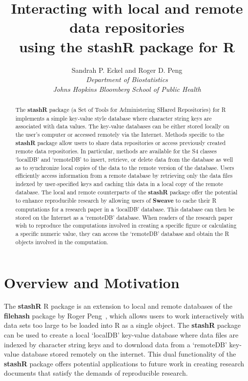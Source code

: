 \documentclass{article}
\title{Interacting with local and remote data repositories\\ 
using the \textbf{stashR} package for R}
\author{Sandrah P. Eckel and Roger D. Peng \\
\textit{Department of
Biostatistics}\\\textit{Johns Hopkins Bloomberg School of Public Health}}
\date{}
\newcommand{\pkg}{\textbf}
\begin{document}
\maketitle

\begin{abstract}
The \pkg{stashR} package (a Set of Tools for Administering SHared
Repositories) for R implements a simple key-value style database
where character string keys are associated with data values. The
key-value databases can be either stored locally on the user's
computer or accessed remotely via the Internet. Methods specific to
the \pkg{stashR} package allow users to share data repositories or
access previously created remote data repositories. In particular,
methods are available for the S4 classes `localDB' and `remoteDB'
to insert, retrieve, or delete data from the database as well as to
synchronize local copies of the data to the remote version of the
database. Users efficiently access information from a remote
database by retrieving only the data files indexed by
user-specified keys and caching this data in a local copy of the
remote database. The local and remote counterparts of the \pkg{stashR}
package offer the potential to enhance reproducible research by
allowing users of \pkg{Sweave} to cache their R computations for a
research paper in a `localDB' database. This database can then be
stored on the Internet as a `remoteDB' database. When readers of
the research paper wish to reproduce the computations involved in
creating a specific figure or calculating a specific numeric value,
they can access the `remoteDB' database and obtain the R objects
involved in the computation.


\end{abstract}


\section{Overview and Motivation}

The \pkg{stashR} R package is an extension to local and remote databases of the  
\pkg{filehash} package by Roger Peng~\citep{filehash}, which allows users to work 
interactively with data sets too large to be loaded into R as a single object. 
The \pkg{stashR} package can be used to create a local `localDB'
key-value database where data files are indexed by character string keys and to download
data from a `remoteDB' key-value database stored remotely on the 
internet. This dual functionality of the \pkg{stashR} package
offers potential applications to future work in creating research documents
that satisfy the demands of reproducible research.
\end{document}
